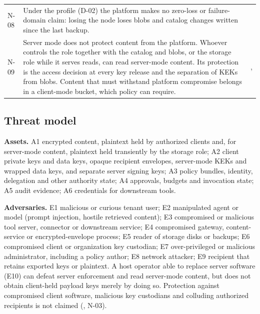 \begin{longtable}{@{}P{0.07\textwidth}P{0.55\textwidth}P{0.27\textwidth}@{}}
N-08 & Under the  profile (D-02) the platform makes no zero-loss or failure-domain claim: losing the node loses blobs and catalog changes written since the last backup. & \\
N-09 & Server mode does not protect content from the platform. Whoever controls the  role together with the catalog and blobs, or the storage role while it serves reads, can read server-mode content. Its protection is the access decision at every key release and the separation of KEKs from blobs. Content that must withstand platform compromise belongs in a client-mode bucket, which policy can require. & , \\
\bottomrule
\end{longtable}

\subsection{Threat model}\label{sec:threats}
\textbf{Assets.} A1 encrypted content, plaintext held by authorized clients and, for server-mode content, plaintext held transiently by the storage role; A2 client private keys and data keys, opaque recipient envelopes, server-mode KEKs and wrapped data keys, and separate server signing keys; A3 policy bundles, identity, delegation and other authority state; A4 approvals, budgets and invocation state; A5 audit evidence; A6 credentials for downstream tools.

\textbf{Adversaries.} E1 malicious or curious tenant user; E2 manipulated agent or model (prompt injection, hostile retrieved content); E3 compromised or malicious tool server, connector or downstream service; E4 compromised gateway, content-service or encrypted-envelope process; E5 reader of storage disks or backups; E6 compromised client or organization key custodian; E7 over-privileged or malicious administrator, including a policy author; E8 network attacker; E9 recipient that retains exported keys or plaintext. A host operator able to replace server software (E10) can defeat server enforcement and read server-mode content, but does not obtain client-held payload keys merely by doing so. Protection against compromised client software, malicious key custodians and colluding authorized recipients is not claimed (, N-03).

